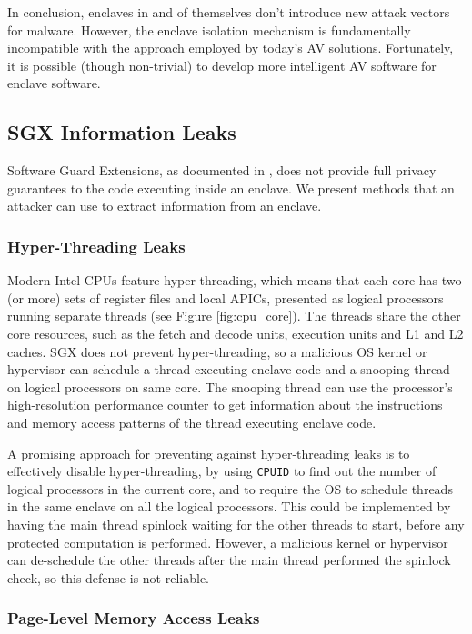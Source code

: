 In conclusion, enclaves in and of themselves don't introduce new attack vectors
for malware. However, the enclave isolation mechanism is fundamentally
incompatible with the approach employed by today's AV solutions. Fortunately,
it is possible (though non-trivial) to develop more intelligent AV software for
enclave software.


\subsection{SGX Information Leaks}
\label{sec:sgx_leaks}

Software Guard Extensions, as documented in \cite{intel2015sdm}, does not
provide full privacy guarantees to the code executing inside an enclave. We
present methods that an attacker can use to extract information from an
enclave.

\subsubsection{Hyper-Threading Leaks}

Modern Intel CPUs feature hyper-threading, which means that each core has two
(or more) sets of register files and local APICs, presented as logical
processors running separate threads (see Figure \ref{fig:cpu_core}). The
threads share the other core resources, such as the fetch and decode units,
execution units and L1 and L2 caches. SGX does not prevent hyper-threading, so
a malicious OS kernel or hypervisor can schedule a thread executing enclave
code and a snooping thread on logical processors on same core. The snooping
thread can use the processor's high-resolution performance counter
\cite{petters1999making} to get information about the instructions and memory
access patterns of the thread executing enclave code.

A promising approach for preventing against hyper-threading leaks is to
effectively disable hyper-threading, by using \texttt{CPUID} to find out the
number of logical processors in the current core, and to require the OS to
schedule threads in the same enclave on all the logical processors. This could
be implemented by having the main thread spinlock waiting for the other threads
to start, before any protected computation is performed. However, a malicious
kernel or hypervisor can de-schedule the other threads after the main thread
performed the spinlock check, so this defense is not reliable.

\subsubsection{Page-Level Memory Access Leaks}

